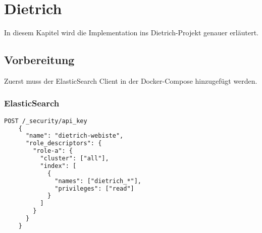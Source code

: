 \chapter{Dietrich}

In diesem Kapitel wird die Implementation ins Dietrich-Projekt genauer erläutert.

\section{Vorbereitung}

Zuerst muss der ElasticSearch Client in der Docker-Compose hinzugefügt werden. 

\subsection{ElasticSearch}

\begin{lstlisting}[language=XML, frame=single, label={lst:es01}] 
    POST /_security/api_key
    {
      "name": "dietrich-webiste",
      "role_descriptors": { 
        "role-a": {
          "cluster": ["all"],
          "index": [
            {
              "names": ["dietrich_*"],
              "privileges": ["read"]
            }
          ]
        }
      }
    }
\end{lstlisting}

